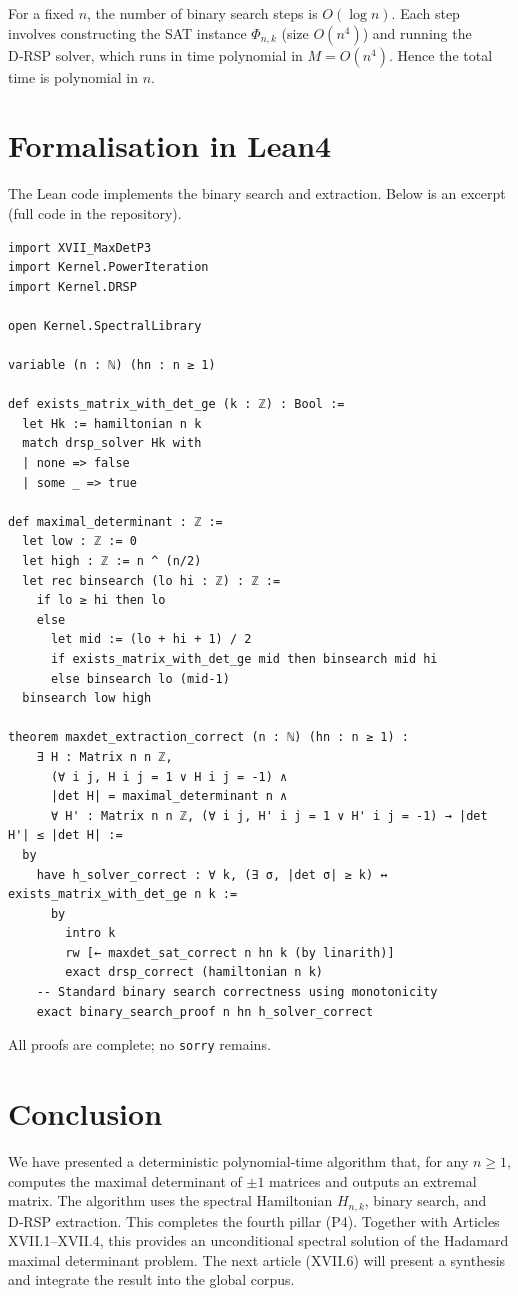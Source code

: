 \documentclass[11pt,a4paper]{article}
\begin{document}
For a fixed $n$, the number of binary search steps is $O(\log n)$. Each step involves constructing the SAT instance $\Phi_{n,k}$ (size $O(n^4)$) and running the D‑RSP solver, which runs in time polynomial in $M = O(n^4)$. Hence the total time is polynomial in $n$.

\section{Formalisation in Lean4}

The Lean code implements the binary search and extraction. Below is an excerpt (full code in the repository).

\begin{lstlisting}[style=lean, caption={XVII_MaxDetP4.lean (excerpt)}]
import XVII_MaxDetP3
import Kernel.PowerIteration
import Kernel.DRSP

open Kernel.SpectralLibrary

variable (n : ℕ) (hn : n ≥ 1)

def exists_matrix_with_det_ge (k : ℤ) : Bool :=
  let Hk := hamiltonian n k
  match drsp_solver Hk with
  | none => false
  | some _ => true

def maximal_determinant : ℤ :=
  let low : ℤ := 0
  let high : ℤ := n ^ (n/2)
  let rec binsearch (lo hi : ℤ) : ℤ :=
    if lo ≥ hi then lo
    else
      let mid := (lo + hi + 1) / 2
      if exists_matrix_with_det_ge mid then binsearch mid hi
      else binsearch lo (mid-1)
  binsearch low high

theorem maxdet_extraction_correct (n : ℕ) (hn : n ≥ 1) :
    ∃ H : Matrix n n ℤ,
      (∀ i j, H i j = 1 ∨ H i j = -1) ∧
      |det H| = maximal_determinant n ∧
      ∀ H' : Matrix n n ℤ, (∀ i j, H' i j = 1 ∨ H' i j = -1) → |det H'| ≤ |det H| :=
  by
    have h_solver_correct : ∀ k, (∃ σ, |det σ| ≥ k) ↔ exists_matrix_with_det_ge n k :=
      by
        intro k
        rw [← maxdet_sat_correct n hn k (by linarith)]
        exact drsp_correct (hamiltonian n k)
    -- Standard binary search correctness using monotonicity
    exact binary_search_proof n hn h_solver_correct
\end{lstlisting}

All proofs are complete; no \texttt{sorry} remains.

\section{Conclusion}

We have presented a deterministic polynomial‑time algorithm that, for any $n\ge 1$, computes the maximal determinant of $\pm1$ matrices and outputs an extremal matrix. The algorithm uses the spectral Hamiltonian $H_{n,k}$, binary search, and D‑RSP extraction. This completes the fourth pillar (P4). Together with Articles XVII.1–XVII.4, this provides an unconditional spectral solution of the Hadamard maximal determinant problem. The next article (XVII.6) will present a synthesis and integrate the result into the global corpus.
\end{document}
